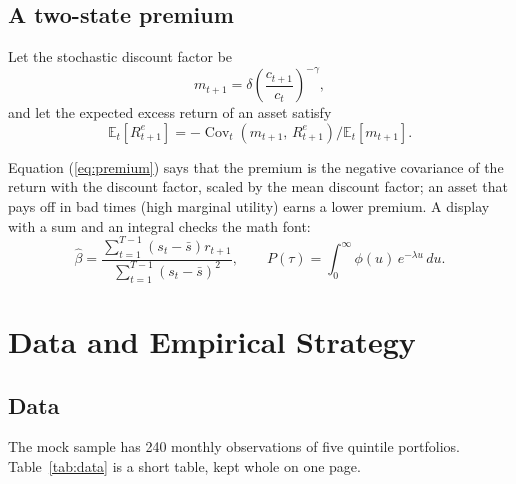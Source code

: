 \documentclass{lrreview}
\begin{document}
\subsection{A two-state premium}
 Let the stochastic discount factor be
\begin{equation}
  m_{t+1} = \delta \left( \frac{c_{t+1}}{c_t} \right)^{-\gamma} ,
  \label{eq:sdf}
\end{equation}
and let the expected excess return of an asset satisfy
\begin{equation}
  \mathbb{E}_t\!\left[ R^{e}_{t+1} \right] = - \operatorname{Cov}_t\!\left( m_{t+1},\, R^{e}_{t+1} \right) \big/ \mathbb{E}_t\!\left[ m_{t+1} \right] .
  \label{eq:premium}
\end{equation}
\begin{lrdefs}
\end{lrdefs}
Equation (\ref{eq:premium}) says that the premium is the negative covariance
of the return with the discount factor, scaled by the mean discount factor;
an asset that pays off in bad times (high marginal utility) earns a lower
premium. A display with a sum and an integral checks the math font:
\begin{equation}
  \hat{\beta} = \frac{\sum_{t=1}^{T-1} \left( s_t - \bar{s} \right) r_{t+1}}{\sum_{t=1}^{T-1} \left( s_t - \bar{s} \right)^{2}} ,
  \qquad
  P(\tau) = \int_{0}^{\infty} \phi(u)\, e^{-\lambda u}\, du .
  \label{eq:ols}
\end{equation}

\section{Data and Empirical Strategy}

\subsection{Data}
The mock sample has 240 monthly observations of five quintile portfolios.
Table~\ref{tab:data} is a short table, kept whole on one page.
\end{document}
